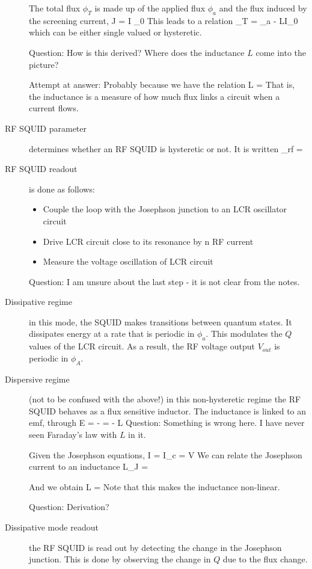 \begin{description}
The total flux $\phi_T$ is made up of the applied flux $\phi_a$ and the flux induced by the screening current, 
\beq
J = I _0 \sin{\delta}
\eeq
This leads to a relation
\beq
\phi_T = \phi_a - LI_0 
\eeq
which can be either single valued or hysteretic. 

Question: How is this derived? Where does the inductance $L$ come into the picture? 

Attempt at answer: Probably because we have the relation
\beq
L = 
\eeq
That is, the inductance is a measure of how much flux links a circuit when a current flows. 

\item[RF SQUID parameter] determines whether an RF SQUID is hysteretic or not. It is written
\beq
\beta_{rf} =  
\eeq


\item[RF SQUID readout] is done as follows:
\begin{itemize}
\item Couple the loop with the Josephson junction to an LCR oscillator circuit 
\item Drive LCR circuit close to its resonance by n RF current
\item Measure the voltage oscillation of LCR circuit 
\end{itemize}

Question: I am unsure about the last step - it is not clear from the notes. 

\item[Dissipative regime] in this mode, the SQUID makes transitions between quantum states. It dissipates energy at a rate that is periodic in $\phi_a$. This modulates the $Q$ values of the LCR circuit. As a result, the RF voltage output $V_{out}$ is periodic in $\phi_A$. 



\item[Dispersive regime] (not to be confused with the above!) in this non-hysteretic regime the RF SQUID behaves as a flux sensitive inductor. The inductance is linked to an emf, through
\beq
E = -  = - L 
\eeq
Question: Something is wrong here. I have never seen Faraday's law with $L$ in it. 

Given the Josephson equations, 
\beq
I = I_c \sin{\phi}
\eeq
\beq
{} =  V
\eeq
We can relate the Josephson current to an inductance
\beq
L_J = 
\eeq

And we obtain
\beq
L = 
\eeq
Note that this makes the inductance non-linear. 

Question: Derivation? 

\item[Dissipative mode readout] the RF SQUID is read out by detecting the change in the Josephson junction. This is done by observing the change in $Q$ due to the flux change. 



\end{description}

